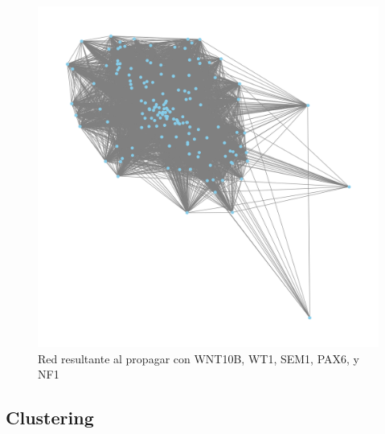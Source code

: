 \begin{figure}[!h] %
	\centering
	\includegraphics[width=1\textwidth]{figures/graph_no_weights.png} %
	\caption{Red resultante al propagar con WNT10B, WT1, SEM1, PAX6, y NF1} %
	\label{fig:grafoPropagado}
\end{figure}

\subsection{Clustering}

